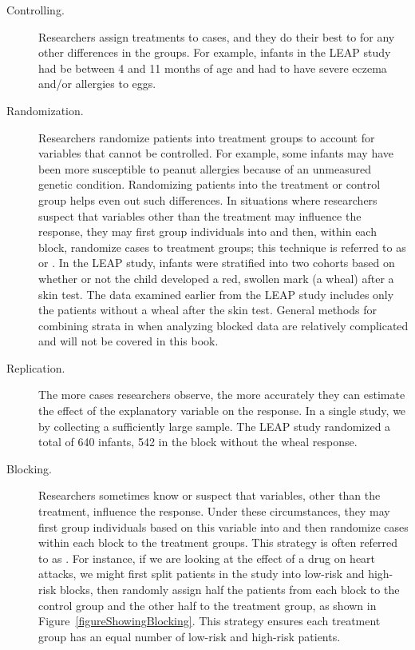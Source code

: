 \begin{doublespace}

\begin{description}

	\item[Controlling.] Researchers assign treatments to cases, and they do their best to  for any other differences in the groups.  For example, infants in the LEAP study had be between 4 and 11 months of age and had to have severe eczema and/or allergies to eggs.  

	\item[Randomization.] Researchers randomize patients into treatment groups to account for variables that cannot be controlled. For example, some infants may have been more susceptible to peanut allergies because of an unmeasured genetic condition. Randomizing patients into the treatment or control group helps even out such differences. In situations where researchers suspect that variables other than the treatment may influence the response, they may first group individuals into  and then, within each block, randomize cases to treatment groups; this technique is referred to as  or .  In the LEAP study, infants were stratified into two cohorts based on whether or not the child developed a red, swollen mark (a wheal) after a skin test.  The data examined earlier from the LEAP study includes only the patients without a wheal after the skin test.  General methods for combining strata in when analyzing blocked data are relatively complicated and will not be covered in this book.

	\item[Replication.] The more cases researchers observe, the more accurately they can estimate the effect of the explanatory variable on the response. In a single study, we  by collecting a sufficiently large sample.  The LEAP study randomized a total of 640 infants, 542 in the block without the wheal response.
	
		\item[Blocking.] Researchers sometimes know or suspect that variables, other than the treatment, influence the response. Under these circumstances, they may first group individuals based on this variable into  and then randomize cases within each block to the treatment groups. This strategy is often referred to as . For instance, if we are looking at the effect of a drug on heart attacks, we might first split patients in the study into low-risk and high-risk blocks, then randomly assign half the patients from each block to the control group and the other half to the treatment group, as shown in Figure~\ref{figureShowingBlocking}. This strategy ensures each treatment group has an equal number of low-risk and high-risk patients.
		

\end{description}
\end{doublespace}
